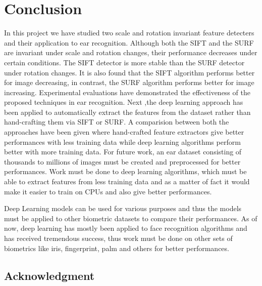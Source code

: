 \chapter{Conclusion} \label{sec:conc} In this project we have studied two scale and rotation invariant feature detecters and their application to ear recognition. Although both the SIFT and the SURF are invariant under scale and rotation changes, their performance decreases under certain conditions. The SIFT detector is more stable than the SURF detector under rotation changes. It is also found that the SIFT algorithm performs better for image decreasing, in contrast, the SURF algorithm performs better for image increasing. Experimental evaluations have demonstrated the effectiveness of the proposed techniques in ear recognition. Next ,the deep learning approach has been applied to automatically extract the features from the dataset rather than hand-crafting them via SIFT or SURF. A comparision between both the approaches have been given where hand-crafted feature extractors give better performances with less training data while deep learning algorithms perform better with more training data. For future work, an ear dataset consisting of thousands to millions of images must be created and preprocessed for better performances. Work must be done to deep learning algorithms, which must be able to extract features from less training data and as a matter of fact it would make it easier to train on CPUs and also give better performances.

Deep Learning models can be used for various purposes and thus the models must be applied to other biometric datasets to compare their performances. As of now, deep learning has mostly been applied to face recognition algorithms and has received tremendous success, thus work must be done on other sets of biometrics like iris, fingerprint, palm and others for better performances.


\section*{Acknowledgment}

